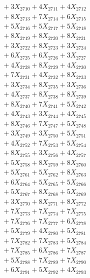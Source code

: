 \documentclass[a4paper,10pt]{article}
\begin{document}
{\begin{align}
&\;  + 3 X_{2710} + 4 X_{2711} + 4 X_{2712} \\[0.3ex]
&\;  + 8 X_{2713} + 7 X_{2714} + 6 X_{2715} \\[0.3ex]
&\;  + 5 X_{2716} + 5 X_{2717} + 5 X_{2718} \\[0.3ex]
&\;  + 8 X_{2719} + 8 X_{2720} + 8 X_{2721} \\[0.3ex]
&\;  + 3 X_{2722} + 8 X_{2723} + 3 X_{2724} \\[0.3ex]
&\;  + 6 X_{2725} + 6 X_{2726} + 3 X_{2727} \\[0.3ex]
&\;  + 4 X_{2728} + 8 X_{2729} + 4 X_{2730} \\[0.3ex]
&\;  + 7 X_{2731} + 4 X_{2732} + 8 X_{2733} \\[0.3ex]
&\;  + 3 X_{2734} + 8 X_{2735} + 3 X_{2736} \\[0.3ex]
&\;  + 4 X_{2737} + 8 X_{2738} + 8 X_{2739} \\[0.5ex]\allowbreak
&\;  + 8 X_{2740} + 7 X_{2741} + 5 X_{2742} \\[0.3ex]
&\;  + 4 X_{2743} + 3 X_{2744} + 4 X_{2745} \\[0.3ex]
&\;  + 8 X_{2746} + 7 X_{2747} + 5 X_{2748} \\[0.3ex]
&\;  + 3 X_{2749} + 3 X_{2750} + 5 X_{2751} \\[0.3ex]
&\;  + 4 X_{2752} + 7 X_{2753} + 5 X_{2754} \\[0.3ex]
&\;  + 8 X_{2755} + 3 X_{2756} + 4 X_{2757} \\[0.3ex]
&\;  + 5 X_{2758} + 8 X_{2759} + 8 X_{2760} \\[0.3ex]
&\;  + 5 X_{2761} + 5 X_{2762} + 8 X_{2763} \\[0.3ex]
&\;  + 6 X_{2764} + 5 X_{2765} + 5 X_{2766} \\[0.3ex]
&\;  + 5 X_{2767} + 8 X_{2768} + 5 X_{2769} \\[0.5ex]\allowbreak
&\;  + 3 X_{2770} + 8 X_{2771} + 8 X_{2772} \\[0.3ex]
&\;  + 7 X_{2773} + 7 X_{2774} + 7 X_{2775} \\[0.3ex]
&\;  + 7 X_{2776} + 7 X_{2777} + 6 X_{2778} \\[0.3ex]
&\;  + 5 X_{2779} + 4 X_{2780} + 5 X_{2781} \\[0.3ex]
&\;  + 7 X_{2782} + 7 X_{2783} + 5 X_{2784} \\[0.3ex]
&\;  + 7 X_{2785} + 6 X_{2786} + 7 X_{2787} \\[0.3ex]
&\;  + 5 X_{2788} + 7 X_{2789} + 7 X_{2790} \\[0.3ex]
&\;  + 6 X_{2791} + 5 X_{2792} + 4 X_{2793} \\[0.3ex]

\end{align}}
\end{document}
